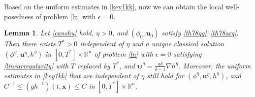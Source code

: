 \documentclass[11pt,reqno]{amsart}
\newtheorem{lem}{Lemma}[section]
\numberwithin{rk}{section}
\numberwithin{prop}{section}
\numberwithin{mydef}{section}
\numberwithin{lem}{section}
\numberwithin{equation}{section}
\numberwithin{thm}{section}
\begin{document}
Based on the uniform estimates in \eqref{key1kk}, now we can obtain the local well-posedness of problem \eqref{ln} with $\epsilon=0$.

 




\begin{lem}\label{epsilon0}
Let \eqref{canshu} hold, $\eta>0$, and $(\phi_0,\boldsymbol{u}_0)$ satisfy \eqref{th78qq}--\eqref{th78zxq}. Then there exists $T^*>0$ independent of $\eta$ and a unique classical solution $(\phi^\eta,\boldsymbol{u}^\eta, h^\eta)$ in $[0,T^*]\times\mathbb{R}^n$ of  problem \eqref{ln} with  $\epsilon=0$ satisfying \eqref{linearregularity} with $T$ replaced by $T^*$, and $\boldsymbol{\psi}^\eta=\frac{a\delta}{\delta-1}\nabla h^\eta$. Moreover, the uniform estimates in \eqref{key1kk} that are independent of $\eta$ still hold for $(\phi^\eta,\boldsymbol{u}^\eta,h^\eta)$, and $C^{-1}\leq (gh^{-1})(t,\boldsymbol{x})\leq C$ in $[0,T^*]\times\mathbb{R}^n$.
\end{lem}
\end{document}
